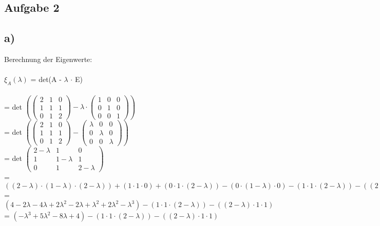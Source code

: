 \documentclass{article}
\begin{document}
	\subsection*{Aufgabe 2}
	\subsection*{a)}
	Berechnung der Eigenwerte: \\ \\
	$\xi_{A}(\lambda)$ = det(A - $\lambda$ $\cdot$ E) \\ \\
	= det
	$\left(
	\left(
	\begin{array}{ccc}
	2&1&0 \\ 1&1&1 \\ 0&1&2 
	\end{array}
	\right)
	-
	\lambda \cdot 
	\left(\begin{array}{ccc}
	1&0&0 \\ 0&1&0 \\ 0&0&1
	\end{array}\right)
	\right)$ \\
	= det
	$\left(
	\left(
	\begin{array}{ccc}
	2&1&0 \\ 1&1&1 \\ 0&1&2 
	\end{array}
	\right)
	-
	\left(\begin{array}{ccc}
	\lambda&0&0 \\ 0&\lambda&0 \\ 0&0&\lambda
	\end{array}\right)
	\right)$ \\
	= det
	$\left(
	\begin{array}{ccc}
	2 - \lambda&1&0 \\ 1&1- \lambda&1 \\ 0&1&2- \lambda 
	\end{array}
	\right)$ \\
	= $((2-\lambda) \cdot (1 - \lambda) \cdot (2-\lambda)) + (1 \cdot 1 \cdot 0) + (0 \cdot 1 \cdot (2 - \lambda)) - (0 \cdot (1-\lambda) \cdot 0) - (1 \cdot 1 \cdot (2 - \lambda)) - ((2 - \lambda) \cdot 1 \cdot 1)$ \\
	=
	$
	(4 - 2\lambda - 4\lambda + 2\lambda^{2} -2\lambda + \lambda^{2} + 2\lambda^{2} - \lambda^{3}) -(1 \cdot 1 \cdot (2 - \lambda)) - ((2 - \lambda) \cdot 1 \cdot 1)$ \\
	=
	$
	(-\lambda^{3}+ 5\lambda^{2}- 8\lambda + 4) -(1 \cdot 1 \cdot (2 - \lambda)) - ((2 - \lambda) \cdot 1 \cdot 1)$ \\
\end{document}
